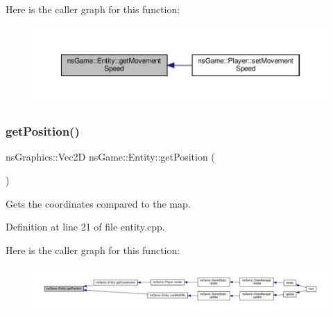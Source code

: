 Here is the caller graph for this function\+:\nopagebreak
\begin{figure}[H]
\begin{center}
\leavevmode
\includegraphics[width=350pt]{classns_game_1_1_entity_a03b934337b3c013abcccf3dfea6396d1_icgraph}
\end{center}
\end{figure}
\mbox{\label{classns_game_1_1_entity_ab7fc1631346d2c643161d229dd653edd}} 
\subsubsection{\texorpdfstring{get\+Position()}{getPosition()}}
{\footnotesize\ttfamily ns\+Graphics\+::\+Vec2D ns\+Game\+::\+Entity\+::get\+Position (\begin{DoxyParamCaption}{ }\end{DoxyParamCaption})\hspace{0.3cm}{\ttfamily [virtual]}}



Gets the coordinates compared to the map. 



Definition at line 21 of file entity.\+cpp.

Here is the caller graph for this function\+:\nopagebreak
\begin{figure}[H]
\begin{center}
\leavevmode
\includegraphics[width=350pt]{classns_game_1_1_entity_ab7fc1631346d2c643161d229dd653edd_icgraph}
\end{center}
\end{figure}
\mbox{\label{classns_game_1_1_entity_a5dd00624fa76be09de80a6d2a982ea09}} 
